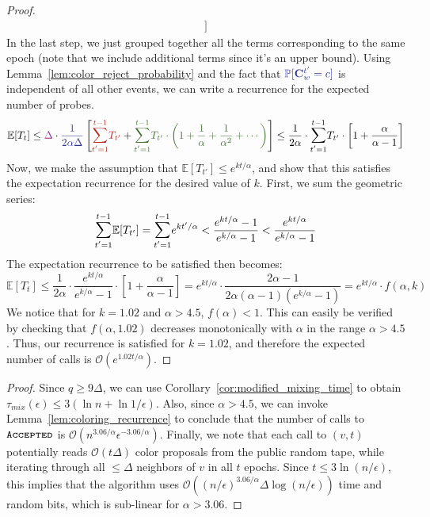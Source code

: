 \begin{proof}
\begin{align}
\Biggr]
\end{align}
In the last step, we just grouped together all the terms corresponding to the same epoch
(note that we include additional terms since it's an upper bound).
Using Lemma~\ref{lem:color_reject_probability} and the fact that $\textcolor{Blue}{\mathbb P[\vec C^{t'}_w = c]}$ is independent of all other events,
we can write a recurrence for the expected number of probes.
\begin{align}
\mathbb E[T_t] \le \textcolor{Fuchsia}{\Delta} \cdot \textcolor{Blue}{\frac{1}{2\alpha\Delta}}
\left[
\textcolor{BrickRed}{\mathlarger\sum\limits_{t'=1}^{t-1} T_{t'}} +
\textcolor{OliveGreen!80!black}{\mathlarger\sum\limits_{t'=1}^{t-1} T_{t'}\cdot \left(1 + \frac1\alpha + \frac1{\alpha^2} + \cdots\right)}
\right]
\le \frac{1}{2\alpha}\cdot \mathlarger\sum\limits_{t'=1}^{t-1} T_{t'}\cdot \left[1 + \frac{\alpha}{\alpha-1} \right]
\end{align}
Now, we make the assumption that $\mathbb E[T_{t'}]\le e^{k t/\alpha}$,
and show that this satisfies the expectation recurrence for the desired value of $k$.
First, we sum the geometric series:
\[
\mathlarger\sum\limits_{t'=1}^{t-1} \mathbb E[T_{t'}] = \mathlarger\sum\limits_{t'=1}^{t-1} e^{k t'/\alpha}
< \frac{e^{k t/\alpha}-1}{e^{k/\alpha}-1} < \frac{e^{k t/\alpha}}{e^{k/\alpha}-1}
\]
The expectation recurrence to be satisfied then becomes:
\[
\mathbb E[T_t]\le \frac 1{2\alpha}\cdot \frac{e^{k t/\alpha}}{e^{k/\alpha}-1}\cdot \left[ 1+ \frac{\alpha}{\alpha-1} \right]
= e^{k t/\alpha}\cdot \frac{2\alpha-1}{2\alpha(\alpha-1)(e^{k/\alpha}-1)} = e^{k t/\alpha}\cdot f(\alpha, k)
\]
We notice that for $k=1.02$ and $\alpha > 4.5$, $f(\alpha) < 1$.
This can easily be verified by checking that $f(\alpha,1.02)$ decreases monotonically with $\alpha$ in the range $\alpha > 4.5$.
Thus, our recurrence is satisfied for $k=1.02$, and therefore the expected number of calls is $\mathcal O(e^{1.02t/\alpha})$.
\end{proof}

\ColoringGrand*
\begin{proof}
Since $q\ge 9\Delta$, we can use Corollary~\ref{cor:modified_mixing_time} to obtain $\tau_{mix}(\epsilon) \le 3(\ln n + \ln 1/\epsilon)$.
Also, since $\alpha > 4.5$, we can invoke Lemma~\ref{lem:coloring_recurrence} to conclude that
the number of calls to $\texttt{\textsc{Accepted}}$ is $\mathcal O(n^{3.06/\alpha}\epsilon^{-3.06/\alpha})$.
Finally, we note that each call to $(v,t)$ potentially reads $\mathcal O(t\Delta)$ color proposals from the public random tape,
while iterating through all $\le \Delta$ neighbors of $v$ in all $t$ epochs.
Since $t \le 3\ln (n/\epsilon)$, this implies that the algorithm uses
$\mathcal O((n/\epsilon)^{3.06/\alpha}\Delta\log (n/\epsilon))$ time and random bits, which is sub-linear for $\alpha > 3.06$.
\end{proof}
